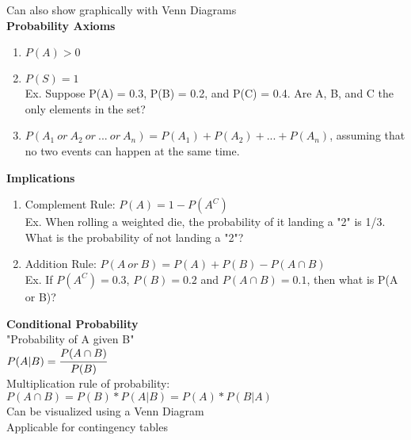 \documentclass[12pt]{article}
\begin{document}
\noindent Can also show graphically with Venn Diagrams \\

\noindent \textbf{Probability Axioms}
\begin{enumerate}[noitemsep]
\item $P(A) > 0$\\
\item $P(S) = 1$\\
Ex. Suppose P(A) = 0.3, P(B) = 0.2, and P(C) = 0.4. Are A, B, and C the only elements in the set?
\item $P(A_1\ or\ A_2\ or\ ...\ or\ A_n) = P(A_1)+P(A_2) + ... + P(A_n)$, assuming that no two events can happen at the same time.
\end{enumerate}

\noindent \textbf{Implications}
\begin{enumerate}[noitemsep]
\item Complement Rule: $P(A) = 1 - P(A^C)$ \\
Ex. When rolling a weighted die, the probability of it landing a "2" is 1/3. What is the probability of not landing a "2"?
\item Addition Rule: $P(A\ or\ B) = P(A) +P(B) - P(A \cap B)$ \\
Ex. If $P(A^C) = 0.3$, $P(B) = 0.2$ and $P(A \cap B) = 0.1$, then what is P(A or B)?
\end{enumerate}
\noindent \textbf{Conditional Probability}\\
\noindent "Probability of A given B" \\
$P(A|B) = \cfrac{P(A \cap B)}{P(B)}$\\
Multiplication rule of probability: $P(A \cap B) = P(B)*P(A|B) = P(A)*P(B|A)$\\

\noindent Can be visualized using a Venn Diagram\\
\noindent Applicable for contingency tables
\end{document}
